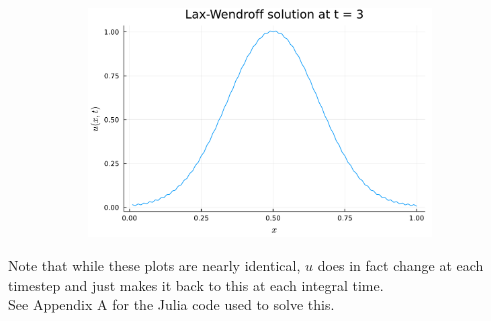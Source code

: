 \documentclass{article}
\begin{document}
\begin{figure}[H]
\begin{subfigure}{0.495\linewidth}
	\end{subfigure}
	\begin{subfigure}{0.495\linewidth}
		\centering
		\includegraphics[width=\linewidth]{p3t3.pdf}
	\end{subfigure}
\end{figure}
Note that while these plots are nearly identical, $u$ does in fact change at each timestep and just makes it back to this at each integral time.\\
See Appendix A for the Julia code used to solve this. 
\end{document}
